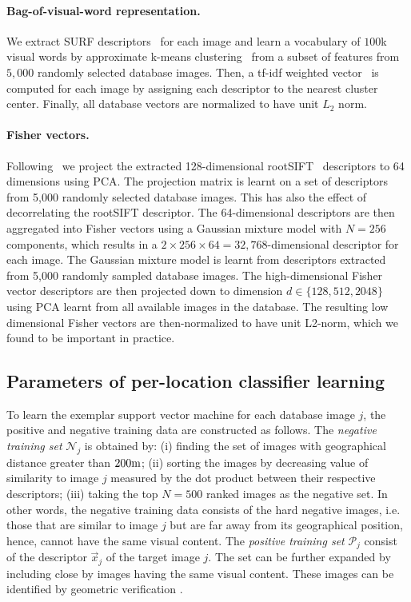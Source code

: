         \paragraph{Bag-of-visual-word representation.}
           We extract SURF descriptors~\cite{Bay06} for each image and learn a vocabulary of $100$k visual words by approximate k-means clustering~\cite{Philbin07} from a subset of features from $5,000$ randomly selected database images. Then, a tf-idf weighted vector~\cite{Sivic03} is computed for each image by assigning each descriptor to the nearest cluster center.  Finally, all database vectors are normalized to have unit $L_2$ norm.
        
        \paragraph{Fisher vectors.}
        Following~\cite{Jegou12} we project the extracted 128-dimensional rootSIFT~\cite{Arandjelovic12} descriptors to 64 dimensions using PCA. The projection matrix is learnt on a set of descriptors from 5,000 randomly selected database images. This has also the effect of decorrelating the rootSIFT descriptor. The 64-dimensional descriptors are then aggregated into Fisher vectors using a Gaussian mixture model with $N=256$ components, which results in a $2\times256\times64 = 32,768$-dimensional descriptor for each image.  
        The Gaussian mixture model is learnt from descriptors extracted from 5,000 randomly sampled database images. The  high-dimensional Fisher vector descriptors are then projected down to dimension $d\in\{128,512, 2048\}$ using PCA learnt from all available images in the database. The resulting low dimensional Fisher vectors are then-normalized to have unit L2-norm, which we found to be important in practice.


      \subsection{Parameters of per-location classifier learning}
        To learn the exemplar support vector machine for each database image $j$, the positive and negative training data are constructed as follows. 
        The \emph{negative training set} $\mathcal N_j$ is obtained by: (i) finding the set of images with geographical distance greater than $200{\rm m}$; (ii)  sorting the images by decreasing value of similarity to image $j$ measured by the dot product between their respective descriptors; (iii) taking the top $N=500$ ranked images as the negative set. 
        In other words, the negative training data consists of the hard negative images, i.e. those that are similar to image $j$ but are far away from its geographical position, hence, cannot have the same visual content. 
        The \emph{positive training set} $\mathcal P_j$ consist of the descriptor $\vec{x}_j$ of the target image $j$. The set can be further expanded by including close by images having the same visual content. These images can be identified by geometric verification \cite{Philbin07}.

